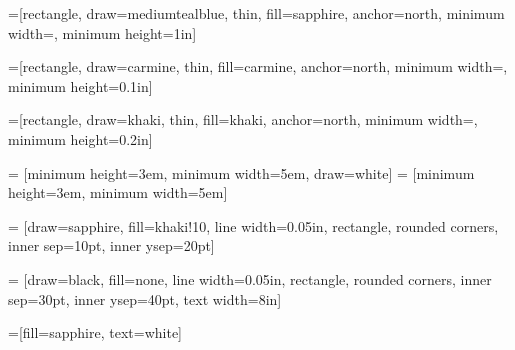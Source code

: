 
=[rectangle, draw=mediumtealblue, thin, fill=sapphire,
                                 anchor=north, minimum width=\pWidth, minimum height=1in]

=[rectangle, draw=carmine, thin, fill=carmine,
                                 anchor=north, minimum width=\pWidth, minimum height=0.1in]

=[rectangle, draw=khaki, thin, fill=khaki,
                                 anchor=north, minimum width=\pWidth, minimum height=0.2in]

 = [minimum height=3em, minimum width=5em, draw=white]
 = [minimum height=3em, minimum width=5em]

 = [draw=sapphire, fill=khaki!10, line width=0.05in,
    rectangle, rounded corners, inner sep=10pt, inner ysep=20pt]

 = [draw=black, fill=none, line width=0.05in,
    rectangle, rounded corners, inner sep=30pt, inner ysep=40pt, text width=8in]

 =[fill=sapphire, text=white]


%
\newcommand{\bi}{\begin{itemize}}
\newcommand{\ei}{\end{itemize}}
\newcommand{\be}{\begin{equation}}
\newcommand{\ee}{\end{equation}}
\newcommand{\bea}{\begin{eqnarray}}
\newcommand{\eea}{\end{eqnarray}}
\newcommand{\bean}{\begin{eqnarray*}}
\newcommand{\eean}{\end{eqnarray*}}
\newcommand{\ben}{\begin{equation*}}        %
\newcommand{\een}{\end{equation*}}


\newenvironment{greenItemize} { \begin{list}
{\color{green}$\bullet$\color{black}}
{ \setlength{\rightmargin}{\leftmargin} \setlength{\itemsep}{0in} } }{ \end{list} }

\newenvironment{redItemize} { \begin{list}
{\color{red}$\bullet$\color{black}}
{ \setlength{\rightmargin}{\leftmargin} \setlength{\itemsep}{0in} } }{ \end{list} }


